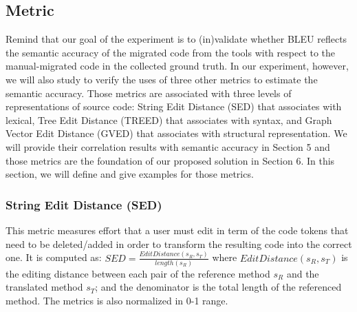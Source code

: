 \subsection{Metric} 
%

Remind that our goal of the experiment is to (in)validate whether BLEU reflects the semantic accuracy of the migrated code from the tools with respect to the manual-migrated code in the collected ground truth. In our experiment, however, we will also study to verify the uses of three other metrics to estimate the semantic accuracy. Those metrics are associated with three levels of representations of source code: String Edit Distance (SED) that associates with lexical, Tree Edit Distance (TREED) that associates with syntax, and Graph Vector Edit Distance (GVED) that associates with structural representation. We will provide their correlation results with semantic accuracy in Section 5 and those metrics are the foundation of our proposed solution in Section 6. In this section, we will define and give examples for those metrics. 

\subsubsection{\textbf{String Edit Distance (SED)}} This metric measures effort that a user must edit in term of the code tokens
that need to be deleted/added in order to transform the
resulting code into the correct one. It is computed as:  $SED = \frac{EditDistance\left(s_R, s_T\right)}{length\left(s_R\right)}$ where $EditDistance\left(s_R, s_T\right)$ is the editing distance between each pair of the reference method $s_R$ and the translated method $s_T$; and the denominator is the total length of the referenced method. The metrics is also normalized in 0-1 range. 





